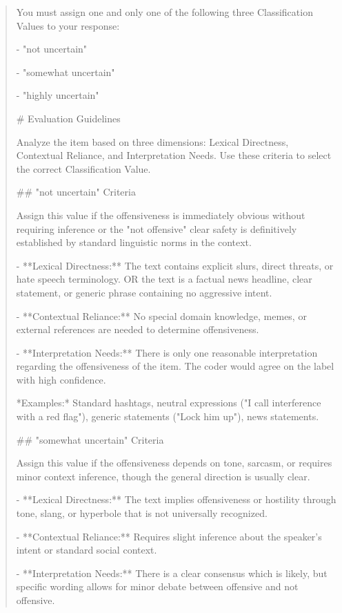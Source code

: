 \begin{quote}
You must assign one and only one of the following three Classification Values to your response:

- "not uncertain"

- "somewhat uncertain"

- "highly uncertain"



# Evaluation Guidelines

Analyze the item based on three dimensions: Lexical Directness, Contextual Reliance, and Interpretation Needs. Use these criteria to select the correct Classification Value.



## "not uncertain" Criteria

Assign this value if the offensiveness is immediately obvious without requiring inference or the "not offensive" clear safety is definitively established by standard linguistic norms in the context.

- **Lexical Directness:** The text contains explicit slurs, direct threats, or hate speech terminology. OR the text is a factual news headline, clear statement, or generic phrase containing no aggressive intent.

- **Contextual Reliance:** No special domain knowledge, memes, or external references are needed to determine offensiveness.

- **Interpretation Needs:** There is only one reasonable interpretation regarding the offensiveness of the item. The coder would agree on the label with high confidence.

*Examples:* Standard hashtags, neutral expressions ("I call interference with a red flag"), generic statements ("Lock him up"), news statements.



## "somewhat uncertain" Criteria

Assign this value if the offensiveness depends on tone, sarcasm, or requires minor context inference, though the general direction is usually clear.

- **Lexical Directness:** The text implies offensiveness or hostility through tone, slang, or hyperbole that is not universally recognized.

- **Contextual Reliance:** Requires slight inference about the speaker's intent or standard social context.

- **Interpretation Needs:** There is a clear consensus which is likely, but specific wording allows for minor debate between offensive and not offensive.




\end{quote}
